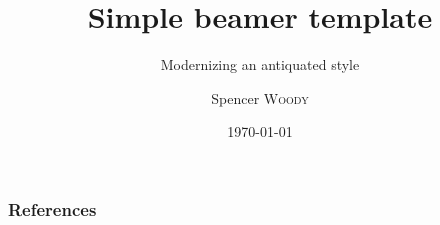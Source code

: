 





\title[Beamer template]{Simple beamer template}
\subtitle{Modernizing an antiquated style}


\author{Spencer \textsc{Woody}}






\date{\today} 
















\begin{frame}[t,allowframebreaks]
\frametitle{References}

\footnotesize
\begingroup
\renewcommand{\section}[2]{}

\endgroup
\normalsize

\end{frame}




